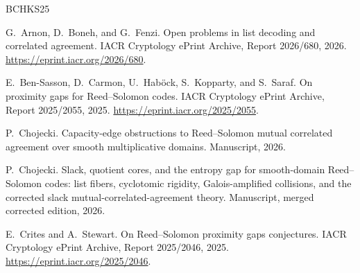 \documentclass[11pt]{article}
\theoremstyle{definition}
\theoremstyle{remark}
\begin{document}
\begin{thebibliography}{BCHKS25}

G.~Arnon, D.~Boneh, and G.~Fenzi.
\newblock Open problems in list decoding and correlated agreement.
\newblock IACR Cryptology ePrint Archive, Report 2026/680, 2026.
\newblock \url{https://eprint.iacr.org/2026/680}.

E.~Ben-Sasson, D.~Carmon, U.~Hab{\"o}ck, S.~Kopparty, and S.~Saraf.
\newblock On proximity gaps for Reed--Solomon codes.
\newblock IACR Cryptology ePrint Archive, Report 2025/2055, 2025.
\newblock \url{https://eprint.iacr.org/2025/2055}.

P.~Chojecki.
\newblock Capacity-edge obstructions to Reed--Solomon mutual correlated agreement over smooth multiplicative domains.
\newblock Manuscript, 2026.

P.~Chojecki.
\newblock Slack, quotient cores, and the entropy gap for smooth-domain Reed--Solomon codes: list fibers, cyclotomic rigidity, Galois-amplified collisions, and the corrected slack mutual-correlated-agreement theory.
\newblock Manuscript, merged corrected edition, 2026.

E.~Crites and A.~Stewart.
\newblock On Reed--Solomon proximity gaps conjectures.
\newblock IACR Cryptology ePrint Archive, Report 2025/2046, 2025.
\newblock \url{https://eprint.iacr.org/2025/2046}.

\end{thebibliography}
\end{document}
